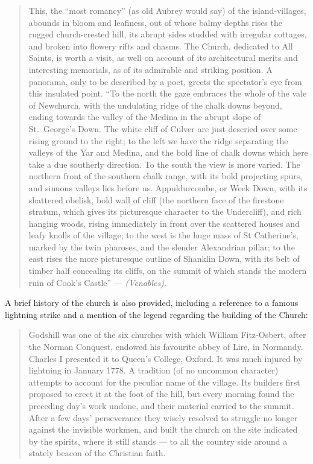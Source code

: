 \documentclass[
  12pt,
  a5paper,
  twoside]{book}
\begin{document}
\begin{quote}
This, the ``most romancy'' (as old Aubrey would say) of the
island-villages, abounds in bloom and leafiness, out of whose balmy
depths rises the rugged church-crested hill, its abrupt sides studded
with irregular cottages, and broken into flowery rifts and chasms. The
Church, dedicated to All Saints, is worth a visit, as well on account of
its architectural merits and interesting memorials, as of its admirable
and striking position. A panorama, only to be described by a poet,
greets the spectator's eye from this insulated point. ``To the north the
gaze embraces the whole of the vale of Newchurch, with the undulating
ridge of the chalk downs beyond, ending towards the valley of the Medina
in the abrupt slope of St.~George's Down. The white cliff of Culver are
just descried over some rising ground to the right; to the left we have
the ridge separating the valleys of the Yar and Medina, and the bold
line of chalk downs which here take a due southerly direction. To the
south the view is more varied. The northern front of the southern chalk
range, with its bold projecting spurs, and sinuous valleys lies before
us. Appuldurcombe, or Week Down, with its shattered obelisk, bold wall
of cliff (the northern face of the firestone stratum, which gives its
picturesque character to the Undercliff), and rich hanging woods, rising
immediately in front over the scattered houses and leafy knolls of the
village; to the west is the huge mass of St Catherine's, marked by the
twin pharoses, and the slender Alexandrian pillar; to the east rises the
more picturesque outline of Shanklin Down, with its belt of timber half
concealing its cliffs, on the summit of which stands the modern ruin of
Cook's Castle'' --- \emph{(Venables).}
\end{quote}

A brief history of the church is also provided, including a reference to
a famous lightning strike and a mention of the legend regarding the
building of the Church:

\begin{quote}
Godshill was one of the six churches with which William Fitz-Osbert,
after the Norman Conquest, endowed his favourite abbey of Lire, in
Normandy. Charles I presented it to Queen's College, Oxford. It was much
injured by lightning in January 1778. A tradition (of no uncommon
character) attempts to account for the peculiar name of the village. Its
builders first proposed to erect it at the foot of the hill, but every
morning found the preceding day's work undone, and their material
carried to the summit. After a few days' perseverance they wisely
resolved to struggle no longer against the invisible workmen, and built
the church on the site indicated by the spirits, where it still stands
--- to all the country side around a stately beacon of the Christian
faith.
\end{quote}
\end{document}
